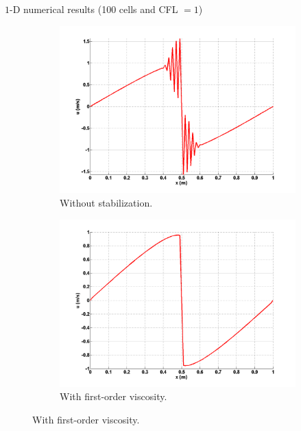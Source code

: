 \documentclass[xcolor=dvipsnames,10pt]{beamer}
\begin{document}
\begin{frame}{$1$-D numerical results (100 cells and CFL $=1$)}
\begin{figure}[H]
        \centering
        \begin{subfigure}[b]{0.37\textwidth}
                \centering
                \includegraphics[width=\textwidth]{../figures/1D_sol_free.png}
                \caption{Without stabilization.}
                \label{fig:1d_burger_free}
        \end{subfigure}%
        \begin{subfigure}[b]{0.37\textwidth}
                \centering
                \includegraphics[width=\textwidth]{../figures/1D_sol_fo.png}
                \caption{With first-order viscosity.}
                \label{fig:1d_burger_fo}
        \end{subfigure}
        

\end{figure}
\end{frame}
\end{document}
